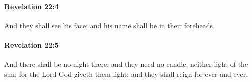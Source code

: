 		\paragraph{Revelation 22:4} %
			\label{REVELATIONNT-22-4}

			And they shall see his face; and his name shall be in their foreheads.

			\begin{framed}
			\scriptsize
				\begin{compactdesc}
					\item[SBLG] 
				\end{compactdesc}
			\end{framed}

		\paragraph{Revelation 22:5} %
			\label{REVELATIONNT-22-5}

			And there shall be no night there; and they need no candle, neither light of the sun; for the Lord God giveth them light: and they shall reign for ever and ever.

